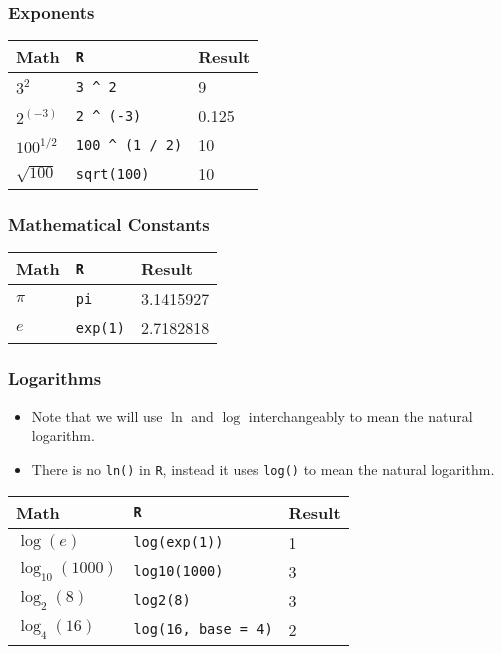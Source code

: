 \documentclass[]{book}
\providecommand{\tightlist}{%
  \setlength{\itemsep}{0pt}\setlength{\parskip}{0pt}}
\begin{document}
\hypertarget{exponents}{%
\subsubsection*{Exponents}\label{exponents}}

\begin{longtable}[]{@{}lll@{}}
\toprule
Math & \texttt{R} & Result\tabularnewline
\midrule
\endhead
\(3^2\) & \texttt{3\ \^{}\ 2} & 9\tabularnewline
\(2^{(-3)}\) & \texttt{2\ \^{}\ (-3)} & 0.125\tabularnewline
\(100^{1/2}\) & \texttt{100\ \^{}\ (1\ /\ 2)} & 10\tabularnewline
\(\sqrt{100}\) & \texttt{sqrt(100)} & 10\tabularnewline
\bottomrule
\end{longtable}

\hypertarget{mathematical-constants}{%
\subsubsection*{Mathematical Constants}\label{mathematical-constants}}

\begin{longtable}[]{@{}lll@{}}
\toprule
Math & \texttt{R} & Result\tabularnewline
\midrule
\endhead
\(\pi\) & \texttt{pi} & 3.1415927\tabularnewline
\(e\) & \texttt{exp(1)} & 2.7182818\tabularnewline
\bottomrule
\end{longtable}

\hypertarget{logarithms}{%
\subsubsection*{Logarithms}\label{logarithms}}

\begin{itemize}
\tightlist
\item
  Note that we will use \(\ln\) and \(\log\) interchangeably to mean the natural logarithm.
\item
  There is no \texttt{ln()} in \texttt{R}, instead it uses \texttt{log()} to mean the natural logarithm.
\end{itemize}

\begin{longtable}[]{@{}lll@{}}
\toprule
Math & \texttt{R} & Result\tabularnewline
\midrule
\endhead
\(\log(e)\) & \texttt{log(exp(1))} & 1\tabularnewline
\(\log_{10}(1000)\) & \texttt{log10(1000)} & 3\tabularnewline
\(\log_{2}(8)\) & \texttt{log2(8)} & 3\tabularnewline
\(\log_{4}(16)\) & \texttt{log(16,\ base\ =\ 4)} & 2\tabularnewline
\bottomrule
\end{longtable}
\end{document}
